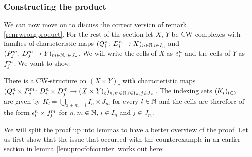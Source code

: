 \subsubsection{Constructing the product}

We can now move on to discuss the correct version of remark \ref{rem:wrongproduct}. 
For the rest of the section let $X$, $Y$ be CW-complexes with families of characteristic maps $(Q_i^n \colon D_i^n \to X)_{n \in \bN, i \in I_n}$ and $(P_j^m \colon D_j^m \to Y)_{m \in \bN, j \in J_n}$. We will write the cells of $X$ as $\openCell{n}{i}$ and the cells of $Y$ as $\openCellf{m}{j}$.
We want to show:

\begin{thm}\label{thm:productcw}
    There is a CW-structure on $(X \times Y)_c$ with characteristic maps $(Q_i^n \times P_j^m \colon D_i^n \times D_j^m \to (X \times Y)_c)_{n,m \in \bN,i \in I_n,j \in J_m}$.
    The indexing sets $(K_l)_{l \in \bN}$ are given by $K_l = \bigcup_{n + m = l}I_n \times J_m$ for every $l \in \bN$ and the cells are therefore of the form $\openCell{n}{i} \times \openCellf{m}{j}$ for $n, m \in \bN$, $i \in I_n$ and $j \in J_m$.
\end{thm}

We will split the proof up into lemmas to have a better overview of the proof. 
Let us first show that the issue that occurred with the counterexample in an earlier section in lemma \ref{lem:proofofcounter} works out here:

